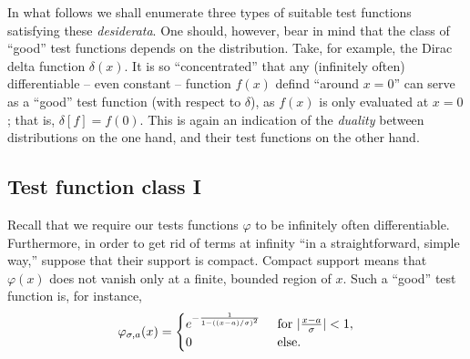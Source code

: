 In what follows we shall enumerate three types of suitable test functions satisfying these {\it desiderata}.
One should, however, bear in mind that the class of ``good'' test functions depends on the distribution.
Take, for example, the Dirac delta function $\delta (x)$. It is so ``concentrated'' that any (infinitely often)
differentiable -- even constant -- function $f(x)$ defind ``around $x=0$''
can serve as a ``good'' test function (with respect to $\delta$),
as $f(x)$ is only evaluated at $x=0$; that is, $\delta[f]=f(0)$.
This is again an indication of the {\em duality} between distributions on the one hand,
and their test functions on the other hand.

\subsection{Test function class I}

Recall that we require \cite{schwartz} our tests functions $\varphi$
to be infinitely often differentiable. Furthermore, in order to get rid of terms at infinity ``in a straightforward, simple way,''
suppose that their support is compact.
Compact support means that $\varphi (x)$ does not vanish only at a finite, bounded region of $x$.
Such a ``good'' test function is, for instance,
\begin{equation}
\varphi_{\sigma ,a}(x)
=
\begin{cases}
e^{-{1\over 1-((x-a)/\sigma )^2}} & \textrm{ for } \vert  {x-a\over \sigma }\vert <1, \\
                                0 & \textrm{ else.}
\end{cases}
\end{equation}

